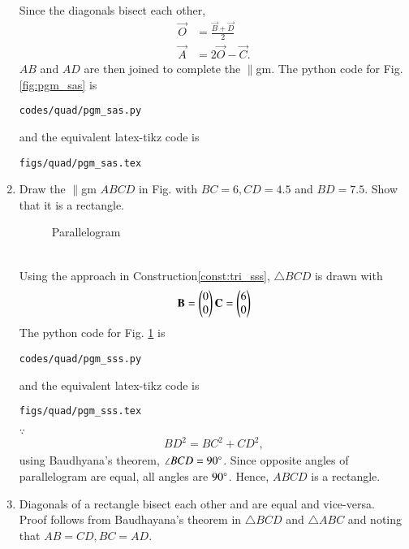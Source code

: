 \begin{enumerate}[label=\arabic*.,ref=\thesubsection.\theenumi]
\begin{align}
\end{align}
%
Since the diagonals bisect each other, 
%
\begin{align}
\vec{O} &= \frac{\vec{B}+\vec{D}}{2}
\\
\vec{A} &= 2\vec{O} - \vec{C}.
\end{align}
%
$AB$ and $AD$ are then joined to complete the $\parallel$gm.
The python code for  Fig. \ref{fig:pgm_sas} is
\begin{lstlisting}
codes/quad/pgm_sas.py
\end{lstlisting}
%
and the equivalent latex-tikz code is
%
\begin{lstlisting}
figs/quad/pgm_sas.tex
\end{lstlisting}
%
\item Draw the $\parallel$gm $ABCD$ in 	Fig. \label{fig:pgm_sss}	
with $BC = 6, CD = 4.5$ and $BD=7.5$.  Show that it is a rectangle.
\label{const:pgm_sss}
%
\begin{figure}[!ht]
	\begin{center}
		\resizebox{\columnwidth}{!}{}
	\end{center}
	\caption{Parallelogram}
	\label{fig:pgm_sss}	
\end{figure}
\\
\solution Using the approach in Construction\ref{const:tri_sss}, $\triangle BCD$ is drawn with
%
\begin{align}
\mathbf{B} = \begin{pmatrix}0\\0\end{pmatrix}
\mathbf{C} = \begin{pmatrix}6\\0\end{pmatrix}
\end{align}
%
The python code for  Fig. \ref{fig:pgm_sss} is
\begin{lstlisting}
codes/quad/pgm_sss.py
\end{lstlisting}
%
and the equivalent latex-tikz code is
%
\begin{lstlisting}
figs/quad/pgm_sss.tex
\end{lstlisting}
%
$\because $
%
\begin{align}
BD^2 = BC^2+CD^2,
\end{align}
using Baudhyana's theorem, $\angle BCD =90\degree$. Since opposite angles  of parallelogram are equal, all angles are $90\degree$.  Hence, $ABCD$ is a rectangle. 
\item  Diagonals of a rectangle bisect each other and are equal and vice-versa. 
\\
\solution Proof follows from Baudhayana's theorem in $\triangle BCD$ and $\triangle ABC$ and noting that $AB = CD, BC = AD$.

\end{enumerate}
